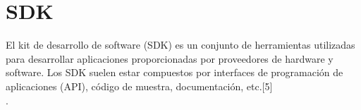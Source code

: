 \section{SDK}
El kit de desarrollo de software (SDK) es un conjunto de herramientas utilizadas para desarrollar aplicaciones proporcionadas por proveedores de hardware y software. Los SDK suelen estar compuestos por interfaces de programación de aplicaciones (API), código de muestra, documentación, etc.[5] \\.\par 
